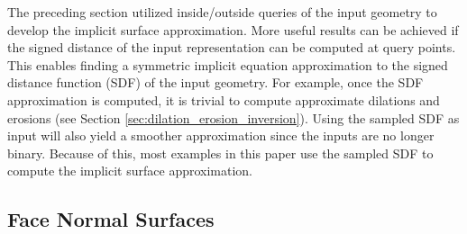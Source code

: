 \documentclass[acmtog]{acmart}
\begin{document}
The preceding section utilized inside/outside queries of the input geometry to develop the implicit surface approximation. More useful results can be achieved if the signed distance of the input representation can be computed at query points. This enables finding a symmetric implicit equation approximation to the signed distance function (SDF) of the input geometry. For example, once the SDF approximation is computed, it is trivial to compute approximate dilations and erosions (see Section \ref{sec:dilation_erosion_inversion}). Using the sampled SDF as input will also yield a smoother approximation since the inputs are no longer binary. Because of this, most examples in this paper use the sampled SDF to compute the implicit surface approximation.

\subsection{Face Normal Surfaces}
\label{sec:face_normal_surfaces}
\end{document}
